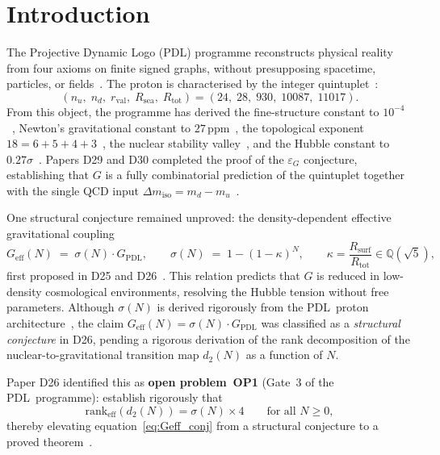 \documentclass[11pt,a4paper]{article}
\theoremstyle{definition}
\newcommand{\PDL}{\textnormal{PDL}}
\newcommand{\Rsurf}{R_{\mathrm{surf}}}
\newcommand{\Rsea}{R_{\mathrm{sea}}}
\newcommand{\Rtot}{R_{\mathrm{tot}}}
\newcommand{\rval}{r_{\mathrm{val}}}
\newcommand{\epsg}{\varepsilon_G}
\newcommand{\dmiso}{\Delta m_{\mathrm{iso}}}
\newcommand{\kap}{\kappa}
\newcommand{\GPDL}{G_{\mathrm{PDL}}}
\newcommand{\Geff}{G_{\mathrm{eff}}}
\newcommand{\sig}{\sigma}
\newcommand{\dmap}{d_2}
\begin{document}
\newpage
\tableofcontents

\section{Introduction}
\label{sec:intro}

The Projective Dynamic Logo (\PDL) programme reconstructs physical reality from four axioms on finite signed graphs, without presupposing spacetime, particles, or fields~\cite{PDL_Main_2026,PDL_Intro_2026}. The proton is characterised by the integer quintuplet~\cite{Combinatorial_Proton_v2_2026}:
\begin{equation}
(n_u,\;n_d,\;\rval,\;\Rsea,\;\Rtot) = (24,\;28,\;930,\;10087,\;11017).
\label{eq:quintuplet}
\end{equation}
From this object, the programme has derived the fine-structure constant to $10^{-4}$~\cite{Alpha_PDL_v2_2026}, Newton's gravitational constant to $27\,\mathrm{ppm}$~\cite{Bridge_PDL_2026}, the topological exponent $18 = 6+5+4+3$~\cite{Topology_18_PDL_2026}, the nuclear stability valley~\cite{Nuclear_Stability_PDL_2026}, and the Hubble constant to $0.27\sigma$~\cite{NCMB_PDL_2026}. Papers D29 and D30 completed the proof of the $\epsg$ conjecture, establishing that $G$ is a fully combinatorial prediction of the quintuplet together with the single QCD input $\dmiso = m_d - m_u$~\cite{PDL_D29_2026,PDL_D30_2026}.

One structural conjecture remained unproved: the density-dependent effective gravitational coupling
\begin{equation}
\Geff(N) \;=\; \sig(N)\cdot\GPDL, \qquad \sig(N) \;=\; 1-(1-\kap)^N, \qquad \kap = \frac{\Rsurf}{\Rtot} \in \mathbb{Q}(\sqrt{5}),
\label{eq:Geff_conj}
\end{equation}
first proposed in D25 and D26~\cite{Effective_Sigma_PDL_2026,Hubble_PDL_2026}. This relation predicts that $G$ is reduced in low-density cosmological environments, resolving the Hubble tension without free parameters. Although $\sig(N)$ is derived rigorously from the \PDL\ proton architecture~\cite{Effective_Sigma_PDL_2026}, the claim $\Geff(N) = \sig(N)\cdot\GPDL$ was classified as a \emph{structural conjecture} in D26, pending a rigorous derivation of the rank decomposition of the nuclear-to-gravitational transition map $\dmap(N)$ as a function of $N$.

Paper D26 identified this as \textbf{open problem~OP1} (Gate~3 of the \PDL\ programme): establish rigorously that
\begin{equation}
\mathrm{rank}_{\mathrm{eff}}(\dmap(N)) = \sig(N)\times 4 \qquad \text{for all } N \geq 0,
\label{eq:gate3}
\end{equation}
thereby elevating equation~\eqref{eq:Geff_conj} from a structural conjecture to a proved theorem~\cite{Hubble_PDL_2026}.
\end{document}
